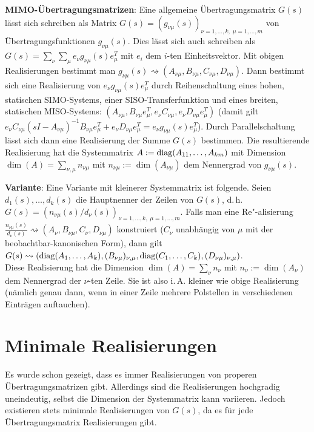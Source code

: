 \linie
\pagebreak

\textbf{MIMO-Übertragungsmatrizen}:
Eine allgemeine Übertragungsmatrix $G(s)$ lässt sich schreiben als Matrix
$G(s) = (g_{\nu\mu}(s))_{\nu=1,\dotsc,k,\;\mu=1,\dotsc,m}$ von Übertragungsfunktionen
$g_{\nu\mu}(s)$.
Dies lässt sich auch schreiben als
$G(s) = \sum_\nu \sum_\mu e_\nu g_{\nu\mu}(s) e_\mu^T$ mit $e_i$ dem $i$-ten Einheitsvektor.
Mit obigen Realisierungen bestimmt man
$g_{\nu\mu}(s) \rightsquigarrow (A_{\nu\mu}, B_{\nu\mu}, C_{\nu\mu}, D_{\nu\mu})$.
Dann bestimmt sich eine Realisierung von $e_\nu g_{\nu\mu}(s) e_\mu^T$ durch Reihenschaltung
eines hohen, statischen SIMO-Systems,
einer SISO-Transferfunktion und eines breiten, statischen MISO-Systems:
$(A_{\nu\mu}, B_{\nu\mu} e_\mu^T, e_\nu C_{\nu\mu}, e_\nu D_{\nu\mu} e_\mu^T)$
(damit gilt $e_\nu C_{\nu\mu} (sI - A_{\nu\mu})^{-1} B_{\nu\mu} e_\mu^T + e_\nu D_{\nu\mu} e_\mu^T
= e_\nu g_{\nu\mu}(s) e_\mu^T$).
Durch Parallelschaltung lässt sich dann eine Realisierung der Summe $G(s)$ bestimmen.
Die resultierende Realisierung hat die Systemmatrix $A := \operatorname{diag}(A_{11}, \dotsc, A_{km})$
mit Dimension
$\dim(A) = \sum_{\nu,\mu} n_{\nu\mu}$ mit
$n_{\nu\mu} := \dim(A_{\nu\mu})$ dem Nennergrad von $g_{\nu\mu}(s)$.

\textbf{Variante}:
Eine Variante mit kleinerer Systemmatrix ist folgende.
Seien $d_1(s), \dotsc, d_k(s)$ die Hauptnenner der Zeilen von $G(s)$, d.\,h.
$G(s) = (n_{\nu\mu}(s)/d_\nu(s))_{\nu=1,\dotsc,k,\;\mu=1,\dotsc,m}$.
Falls man eine Re"-alisierung $\frac{n_{\nu\mu}(s)}{d_\nu(s)} \rightsquigarrow
(A_\nu, B_{\nu\mu}, C_\nu, D_{\nu\mu})$ konstruiert
($C_\nu$ unabhängig von $\mu$ mit der beobachtbar-kanonischen Form), dann gilt
$G(s) \rightsquigarrow (\operatorname{diag}(A_1, \dotsc, A_k), (B_{\nu\mu})_{\nu,\mu},
\operatorname{diag}(C_1, \dotsc, C_k), (D_{\nu\mu})_{\nu,\mu})$.\\
Diese Realisierung hat die Dimension
$\dim(A) = \sum_\nu n_\nu$ mit
$n_\nu := \dim(A_\nu)$ dem Nennergrad der $\nu$-ten Zeile.
Sie ist also i.\,A. kleiner wie obige Realisierung
(nämlich genau dann, wenn in einer Zeile mehrere Polstellen in verschiedenen Einträgen
auftauchen).

\section{%
    Minimale Realisierungen%
}

Es wurde schon gezeigt, dass es immer Realisierungen von properen Übertragungsmatrizen gibt.
Allerdings sind die Realisierungen hochgradig uneindeutig, selbst die Dimension der Systemmatrix
kann variieren.
Jedoch existieren stets minimale Realisierungen von $G(s)$, da es für jede Übertragungsmatrix
Realisierungen gibt.

